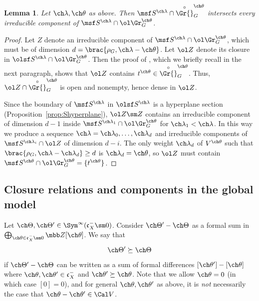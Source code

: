 \documentclass[final]{amsart}
\newtheorem{lem}[subsubsection]{Lemma}
\theoremstyle{remark}
\theoremstyle{definition}
\numberwithin{equation}{section}
\begin{document}
\begin{lem} \label{lem:MVcentralfiber}
Let $\ch\lambda,\ch\theta$ as above. Then 
$\msf S^{\ch\lambda} \cap \overset\circ\Gr{}^{\ch\theta}_G$
intersects every irreducible component 
of $\msf S^{\ch\lambda} \cap \ol\Gr^{\ch\theta}_G$. 
\end{lem}
\begin{proof}
Let $Z$ denote an irreducible component of $\msf S^{\ch\lambda}\cap \ol\Gr^{\ch\theta}_G$, which must be 
of dimension $d=\brac{\rho_G, \ch\lambda-\ch\theta}$.
Let $\ol Z$ denote its closure in $\olsf S^{\ch\lambda} \cap \ol\Gr^{\ch\theta}_G$. 
Then the proof of \cite[Theorem 3.2]{MV}, which we briefly recall in the next paragraph,
shows that $\ol Z$ contains $t^{\ch\theta} \in \overset\circ\Gr{}^{\ch\theta}_G$.
Thus, $\ol Z \cap \overset\circ\Gr{}^{\ch\theta}_G$ is open and nonempty, hence dense 
in $\ol Z$. 

Since the boundary of $\msf S^{\ch\lambda}$ in $\olsf S^{\ch\lambda}$ 
is a hyperplane section (Proposition~\ref{prop:Shyperplane}), 
$\ol Z\sm Z$ contains an irreducible component of dimension $d-1$
inside $\msf S^{\ch\lambda_1}\cap \ol\Gr^{\ch\theta}_G$ for $\ch\lambda_1 < \ch\lambda$. 
In this way we produce a sequence $\ch\lambda=\ch\lambda_0, \dotsc, \ch\lambda_d$
and irreducible components of $\msf S^{\ch\lambda_i} \cap \ol Z$ 
of dimension $d-i$. 
The only weight $\ch\lambda_d$ of $V^{\ch\theta}$ such that 
$\brac{\rho_G,\ch\lambda-\ch\lambda_d} \ge d$ 
is $\ch\lambda_d=\ch\theta$, so $\ol Z$ must contain $\msf S^{\ch\theta}\cap \ol\Gr^{\ch\theta}_G
= \{ t^{\ch\theta} \}$. 
\end{proof}



\subsection{Closure relations and components in the global model}
\label{sect:closures}

Let $\ch\Theta, \ch\Theta' \in \Sym^\infty(\mathfrak c_X^- \sm 0)$. Consider $\ch\Theta'-\ch\Theta$ as a formal sum 
in $\bigoplus_{\ch\theta\in \mathfrak c_X^-\sm 0} \mbb Z [\ch\theta]$. We say that 
\[ \ch\Theta' \succeq \ch\Theta \] 
if $\ch\Theta'-\ch\Theta$ can be written as a sum of formal differences 
$[\ch\theta']-[\ch\theta]$ where $\ch\theta,\ch\theta'\in \mathfrak c_X^-$ and $\ch\theta' \succeq \ch\theta$. 
Note that we allow $\ch\theta=0$ (in which case $[0]=0$), 
and for general $\ch\theta,\ch\theta'$ as
above, it is \emph{not} necessarily the case that $\ch\theta-\ch\theta' \in \Cal V$. 
\end{document}
